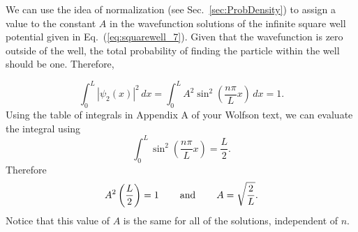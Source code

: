 We can use the idea of normalization (see Sec.~\ref{sec:ProbDensity}) to
assign a value to the constant $A$ in the wavefunction solutions of
the infinite square well potential given in 
Eq.~(\ref{eq:squarewell_7}). Given that the wavefunction is zero outside
of the well, the total probability of finding the particle within the
well should be one.  Therefore,

\begin{equation}
\int_0^L |\psi_2(x)|^2\, dx 
  = \int_0^L A^2 \sin^2\left(\frac{n \pi}{L}x\right)\, dx = 1 .
\end{equation}
Using the table of integrals in Appendix A of your Wolfson text,
we can evaluate the integral using
\begin{equation}
\int_0^L \sin^2\left(\frac{n \pi}{L} x\right) = \frac{L}{2} .
\end{equation}
Therefore
\begin{equation}
A^2 \left( \frac{L}{2} \right) = 1 \hspace{0.3in} 
              \mbox{and} \hspace{0.3in} A = \sqrt{\frac{2}{L}} .
\end{equation}
Notice that this value of $A$ is the same for all of the solutions,
independent of $n$.


